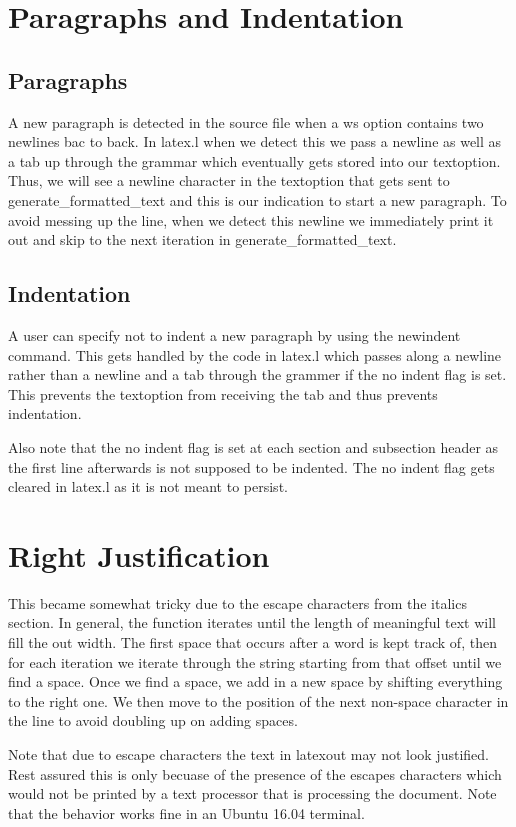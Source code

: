 \section{Paragraphs and Indentation}

\subsection{Paragraphs}
A new paragraph is detected in the source file when a ws option contains two newlines bac
to back. In latex.l when we detect this we pass a newline as well as a tab up through the
grammar which eventually gets stored into our textoption. Thus, we will see a newline
character in the textoption that gets sent to generate_formatted_text and this is our 
indication to start a new paragraph. To avoid messing up the line, when we detect this
newline we immediately print it out and skip to the next iteration in
generate_formatted_text. 

\subsection{Indentation}
A user can specify not to indent a new paragraph by using the newindent command. This gets
handled by the code in latex.l which passes along a newline rather than a newline and a tab
through the grammer if the no indent flag is set. This prevents the textoption from
receiving the tab and thus prevents indentation.

Also note that the no indent flag is set at each section and subsection header as the first
line afterwards is not supposed to be indented. The no indent flag gets cleared in latex.l
as it is not meant to persist.

\section{Right Justification}
This became somewhat tricky due to the escape characters from the italics section. In
general, the function iterates until the length of meaningful text will fill the out width.
The first space that occurs after a word is kept track of, then for each iteration we
iterate through the string starting from that offset until we find a space. Once we find a 
space, we add in a new space by shifting everything to the right one. We then move to the 
position of the next non-space character in the line to avoid doubling up on adding spaces.

Note that due to escape characters the text in latexout may not look justified. Rest
assured this is only becuase of the presence of the escapes characters which would not be
printed by a text processor that is processing the document. Note that the behavior works
fine in an Ubuntu 16.04 terminal.

